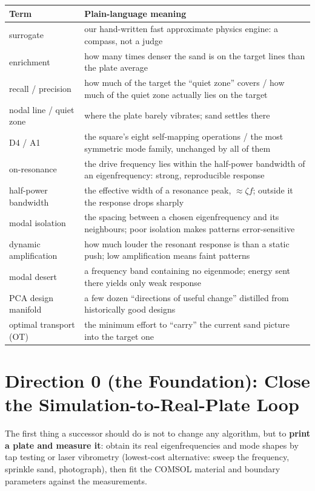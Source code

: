 \documentclass[11pt,a4paper]{article}
\begin{document}
\begin{center}
\small
\begin{tabular}{@{}p{}p{}@{}}
\toprule
Term & Plain-language meaning \\
\midrule
surrogate & our hand-written fast approximate physics engine: a compass, not a judge \\
enrichment & how many times denser the sand is on the target lines than the plate average \\
recall / precision & how much of the target the ``quiet zone'' covers / how much of the quiet zone actually lies on the target \\
nodal line / quiet zone & where the plate barely vibrates; sand settles there \\
D4 / A1 & the square's eight self-mapping operations / the most symmetric mode family, unchanged by all of them \\
on-resonance & the drive frequency lies within the half-power bandwidth of an eigenfrequency: strong, reproducible response \\
half-power bandwidth & the effective width of a resonance peak, $\approx \zeta f$; outside it the response drops sharply \\
modal isolation & the spacing between a chosen eigenfrequency and its neighbours; poor isolation makes patterns error-sensitive \\
dynamic amplification & how much louder the resonant response is than a static push; low amplification means faint patterns \\
modal desert & a frequency band containing no eigenmode; energy sent there yields only weak response \\
PCA design manifold & a few dozen ``directions of useful change'' distilled from historically good designs \\
optimal transport (OT) & the minimum effort to ``carry'' the current sand picture into the target one \\
\bottomrule
\end{tabular}
\end{center}

\section{Direction 0 (the Foundation): Close the Simulation-to-Real-Plate Loop}

The first thing a successor should do is not to change any algorithm, but to \textbf{print a plate and measure it}: obtain its real eigenfrequencies and mode shapes by tap testing or laser vibrometry (lowest-cost alternative: sweep the frequency, sprinkle sand, photograph), then fit the COMSOL material and boundary parameters against the measurements.
\end{document}
